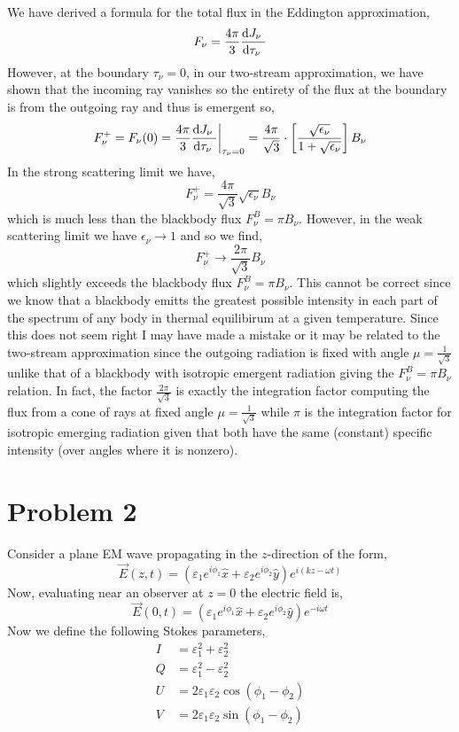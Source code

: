 \documentclass[12pt]{article}
\begin{document}
We have derived a formula for the total flux in the Eddington approximation,
\[ F_\nu = \frac{4 \pi}{3} \frac{\mathrm{d} J_\nu \;}{\mathrm{d} \tau_\nu \;} \]
However, at the boundary $\tau_\nu = 0$, in our two-stream approximation, we have shown that the incoming ray vanishes so the entirety of the flux at the boundary is from the outgoing ray and thus is emergent so,
\[ F_\nu^+ = F_\nu(0) = \frac{4 \pi}{3} \frac{\mathrm{d} J_\nu \;}{\mathrm{d} \tau_\nu \;} \bigg|_{\tau_\nu = 0} = \frac{4 \pi}{\sqrt{3}} \cdot  \left[ \frac{\sqrt{\epsilon_\nu}}{1 + \sqrt{\epsilon_\nu}} \right] B_\nu \]
In the strong scattering limit we have,
\[ F^+_\nu = \frac{4 \pi}{\sqrt{3}} \sqrt{\epsilon_\nu} B_\nu \]
which is much less than the blackbody flux $F^B_\nu = \pi B_\nu$. However, in the weak scattering limit we have $\epsilon_\nu \to 1$ and so we find,
\[ F^+_\nu \to \frac{2\pi}{\sqrt{3}} B_\nu \]
which slightly exceeds the blackbody flux $F^B_\nu = \pi B_\nu$. This cannot be correct since we know that a blackbody emitts the greatest possible intensity in each part of the spectrum of any body in thermal equilibirum at a given temperature. Since this does not seem right I may have made a mistake or it may be related to the two-stream approximation since the outgoing radiation is fixed with angle $\mu = \frac{1}{\sqrt{3}}$ unlike that of a blackbody with isotropic emergent radiation giving the $F^B_\nu = \pi B_\nu$ relation. In fact, the factor $\frac{2 \pi}{\sqrt{3}}$ is exactly the integration factor computing the flux from a cone of rays at fixed angle $\mu = \frac{1}{\sqrt{3}}$ while $\pi$ is the integration factor for isotropic emerging radiation given that both have the same (constant) specific intensity (over angles where it is nonzero). 

\section{Problem 2}

Consider a plane EM wave propagating in the $z$-direction of the form,
\[ \vec{E}(z, t) = (\varepsilon_1 e^{i \phi_1} \hat{x} + \varepsilon_2 e^{i \phi_2} \hat{y}) e^{i (kz - \omega t)} \]
Now, evaluating near an observer at $z = 0$ the electric field is,
\[ \vec{E}(0, t) = (\varepsilon_1 e^{i \phi_1} \hat{x} + \varepsilon_2 e^{i \phi_2} \hat{y}) e^{-i\omega t} \] 
Now we define the following Stokes parameters,
\begin{align*}
I & = \varepsilon_1^2 + \varepsilon_2^2
\\
Q & = \varepsilon_1^2 - \varepsilon_2^2 
\\
U & = 2 \varepsilon_1 \varepsilon_2 \cos{(\phi_1 - \phi_2)}
\\
V & = 2 \varepsilon_1 \varepsilon_2 \sin{(\phi_1 - \phi_2)}
\end{align*}
\end{document}
